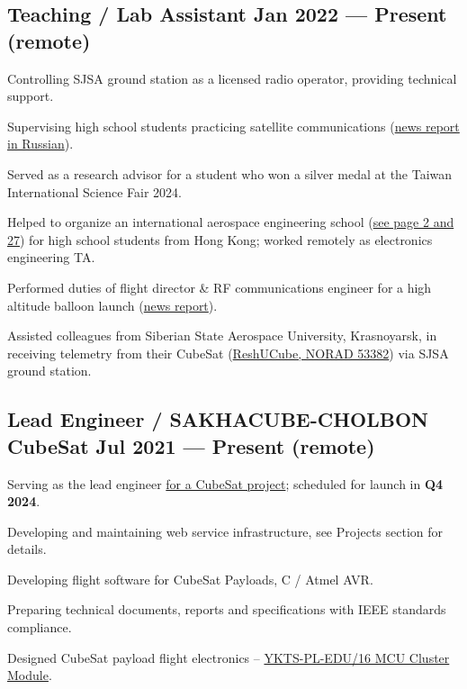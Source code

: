 \documentclass[letter,10pt]{article}
\begin{document}
\subsection{{Teaching / Lab Assistant \hfill Jan 2022 --- Present (remote)}}
\begin{zitemize}
\item Controlling SJSA ground station as a licensed radio operator, providing technical support.
\item Supervising high school students practicing satellite communications (\href{https://www.yakutia.kp.ru/daily/27434.5/4635501/}{news report in Russian}).
\item Served as a research advisor for a student who won a silver medal at the Taiwan International Science Fair 2024.
\item Helped to organize an international aerospace engineering school (\href{https://www.luac.edu.hk/vineyard-2023-2024-issue-3/}{see page 2 and 27}) for high school students from Hong Kong; worked remotely as electronics engineering TA.
\item Performed duties of flight director \& RF communications engineer for a high altitude balloon launch (\href{https://news.tvb.com/tc/local/6643e73a27f15d1b8cd1baf6}{news report}).
\item Assisted colleagues from Siberian State Aerospace University, Krasnoyarsk, in receiving telemetry from their CubeSat (\href{https://db.satnogs.org/satellite/EUTM-6475-4739-7036-7152}{ReshUCube, NORAD 53382}) via SJSA ground station.
\end{zitemize}

\subsection{{Lead Engineer / SAKHACUBE-CHOLBON CubeSat \hfill Jul 2021 --- Present (remote)}}
\begin{zitemize}
\item Serving as the lead engineer \href{https://www.yksa.space/projects/sakhacube-cholbon}{for a CubeSat project}; scheduled for launch in \textbf{Q4 2024}.
\item Developing and maintaining web service infrastructure, see Projects section for details.
\item Developing flight software for CubeSat Payloads, C / Atmel AVR.
\item Preparing technical documents, reports and specifications with IEEE standards compliance.
\item Designed CubeSat payload flight electronics -- \href{https://yktaero.space/projects/item/ykts-pl-edu16-sptx}{YKTS-PL-EDU/16 MCU Cluster Module}.
\end{zitemize}
\end{document}
